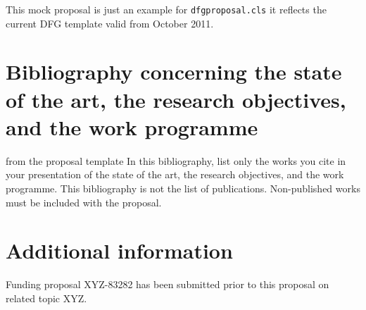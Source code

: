 \documentclass[    %
    gitinfo,       %
    noworkareas,   %
    RAM,           %
    general,       %
    \classoptions] %
    {dfgproposal}
\begin{document}
\begin{center}\color{red}\huge
  This mock proposal is just an example for \texttt{dfgproposal.cls} it reflects the 
  current DFG template valid from October 2011.
\end{center}

\begin{proposal}[
  PI=miko,
  mikoname=Michael Kohlhase,
  mikoaffiliation=FAU Erlangen N\"urnberg,
  mikodept=Computer Science,
  mikotitle=Prof. Dr., 
  pubspage=mikopubs,
  thema=Intelligentes Schreiben von Antr\"agen,
  acronym={iPoWr},
  acrolong={\underline{I}ntelligent} {\underline{P}r\underline{o}posal} {\underline{Wr}iting},
  title=\pn: \protect\pnlong,
  totalduration=3 years,
  start=1. Feb. 2010,
  months=24,
  RM=36,RAM=36,
  discipline=Computer Science, 
  areas=Knowledge Management,
  keywords={LaTeX Active Documents}]






\section{Bibliography concerning the state of the art, the research objectives, and the
  work programme }

\begin{todo}{from the proposal template}
  In this bibliography, list only the works you cite in your presentation of the state of
  the art, the research objectives, and the work programme. This bibliography is not the
  list of publications. Non-published works must be included with the proposal.
\end{todo}
\printbibliography[heading=empty]
\ifpublic\else


\section{Additional information }

Funding proposal XYZ-83282 has been submitted prior to this proposal on related topic XYZ.
\fi %
\end{proposal}
\end{document}
